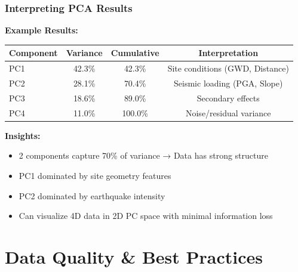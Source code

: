 \documentclass[aspectratio=169]{beamer}
\begin{document}
\begin{frame}
\frametitle{Interpreting PCA Results}

\textbf{Example Results:}
\begin{table}
\centering
\begin{tabular}{lccc}
\toprule
\textbf{Component} & \textbf{Variance} & \textbf{Cumulative} & \textbf{Interpretation} \\
\midrule
PC1 & 42.3\% & 42.3\% & Site conditions (GWD, Distance) \\
PC2 & 28.1\% & 70.4\% & Seismic loading (PGA, Slope) \\
PC3 & 18.6\% & 89.0\% & Secondary effects \\
PC4 & 11.0\% & 100.0\% & Noise/residual variance \\
\bottomrule
\end{tabular}
\end{table}

\vspace{0.5cm}

\textbf{Insights:}
\begin{itemize}
    \item 2 components capture 70\% of variance → Data has strong structure
    \item PC1 dominated by site geometry features
    \item PC2 dominated by earthquake intensity
    \item Can visualize 4D data in 2D PC space with minimal information loss
\end{itemize}

\end{frame}

\section{Data Quality \& Best Practices}
\end{document}
